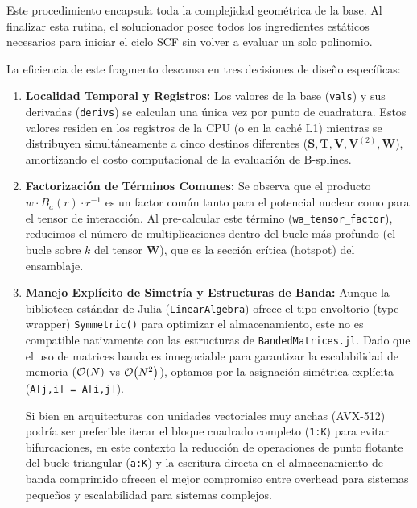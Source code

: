\documentclass[12pt, a4paper, oneside, spanish]{article}
\begin{document}
Este procedimiento encapsula toda la complejidad geométrica de la base. Al finalizar esta rutina, el solucionador posee todos los ingredientes estáticos necesarios para iniciar el ciclo SCF sin volver a evaluar un solo polinomio.

La eficiencia de este fragmento descansa en tres decisiones de diseño específicas:

\begin{enumerate}
    \item \textbf{Localidad Temporal y Registros:} Los valores de la base (\texttt{vals}) y sus derivadas (\texttt{derivs}) se calculan una única vez por punto de cuadratura. Estos valores residen en los registros de la CPU (o en la caché L1) mientras se distribuyen simultáneamente a cinco destinos diferentes (\(\mathbf{S}, \mathbf{T}, \mathbf{V}, \mathbf{V}^{(2)}, \mathbf{W}\)), amortizando el costo computacional de la evaluación de B-splines.
    
    \item \textbf{Factorización de Términos Comunes:} Se observa que el producto \( w \cdot B_a(r) \cdot r^{-1} \) es un factor común tanto para el potencial nuclear como para el tensor de interacción. Al pre-calcular este término (\texttt{wa\_tensor\_factor}), reducimos el número de multiplicaciones dentro del bucle más profundo (el bucle sobre \( k \) del tensor \(\mathbf{W}\)), que es la sección crítica (hotspot) del ensamblaje.
    
    \item \textbf{Manejo Explícito de Simetría y Estructuras de Banda:} 
    Aunque la biblioteca estándar de Julia (\texttt{LinearAlgebra}) ofrece el tipo envoltorio (type wrapper) \texttt{Symmetric()} para optimizar el almacenamiento, este no es compatible nativamente con las estructuras de \texttt{BandedMatrices.jl}. Dado que el uso de matrices banda es innegociable para garantizar la escalabilidad de memoria (\(\order{N}\) vs \(\order{N^2}\)), optamos por la asignación simétrica explícita (\texttt{A[j,i] = A[i,j]}). 
    
    Si bien en arquitecturas con unidades vectoriales muy anchas (AVX-512) podría ser preferible iterar el bloque cuadrado completo (\texttt{1:K}) para evitar bifurcaciones, en este contexto la reducción de operaciones de punto flotante del bucle triangular (\texttt{a:K}) y la escritura directa en el almacenamiento de banda comprimido ofrecen el mejor compromiso entre overhead para sistemas pequeños y escalabilidad para sistemas complejos.
\end{enumerate}
\end{document}
